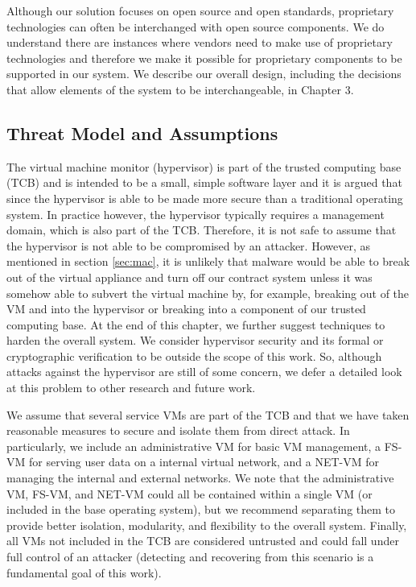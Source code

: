 Although our solution focuses on open source and open standards, proprietary technologies can often be interchanged with open source components. We do understand there are instances where vendors need to make use of proprietary technologies and therefore we make it possible for proprietary components to be supported in our system. We describe our overall design, including the decisions that allow elements of the system to be interchangeable, in Chapter 3.

\subsection{Threat Model and Assumptions}

The virtual machine monitor (hypervisor) is part of the trusted computing base (TCB) and is intended to be a small, simple software layer and it is argued that since the hypervisor is able to be made more secure than a traditional operating system. In practice however, the hypervisor typically requires a management domain, which is also part of the TCB. Therefore, it is not safe to assume that the hypervisor is not able to be compromised by an attacker. However, as mentioned in section \ref{sec:mac}, it is unlikely that malware would be able to break out of the virtual appliance and turn off our contract system unless it was somehow able to subvert the virtual machine by, for example, breaking out of the VM and into the hypervisor or breaking into a component of our trusted computing base. At the end of this chapter, we further suggest techniques to harden the overall system. We consider hypervisor security and its formal or cryptographic verification to be outside the scope of this work. So, although attacks against the hypervisor are still of some concern, we defer a detailed look at this problem to other research and future work.

We assume that several service VMs are part of the TCB and that we have taken reasonable measures to secure and isolate them from direct attack. In particularly, we include an administrative VM for basic VM management, a FS-VM for serving user data on a internal virtual network, and a NET-VM for managing the internal and external networks. We note that the administrative VM, FS-VM, and NET-VM could all be contained within a single VM (or included in the base operating system), but we recommend separating them to provide better isolation, modularity, and flexibility to the overall system. Finally, all VMs not included in the TCB are considered untrusted and could fall under full control of an attacker (detecting and recovering from this scenario is a fundamental goal of this work).

